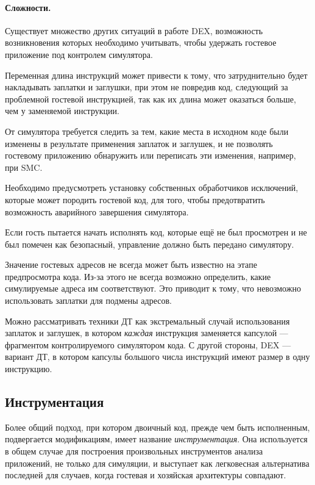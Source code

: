 \paragraph{Сложности.} Существует множество других ситуаций в работе DEX, возможность возникновения которых необходимо учитывать, чтобы удержать гостевое приложение под контролем симулятора.

\begin{itemize*}
    \item Переменная длина инструкций может привести к тому, что затруднительно будет накладывать заплатки и заглушки, при этом не повредив код, следующий за проблемной гостевой инструкцией, так как их длина может оказаться больше, чем у заменяемой инструкции.
    \item   От симулятора требуется следить за тем, какие места в исходном коде были изменены в результате применения заплаток и заглушек, и не позволять гостевому приложению обнаружить или переписать эти изменения, например, при SMC.
   \item Необходимо предусмотреть установку собственных обработчиков исключений, которые может породить гостевой код, для того, чтобы предотвратить возможность аварийного завершения симулятора. 
   \item Если гость пытается начать исполнять код, которые ещё не был просмотрен и не был помечен как безопасный, управление должно быть передано симулятору.
   \item Значение гостевых адресов не всегда может быть известно на этапе предпросмотра кода. Из-за этого не всегда возможно определить, какие симулируемые адреса им соответствуют. Это приводит к тому, что невозможно использовать заплатки для подмены адресов.
\end{itemize*}

\begin{digression}
Можно рассматривать техники ДТ как экстремальный случай использования заплаток и заглушек, в котором \emph{каждая} инструкция заменяется капсулой --- фрагментом контролируемого симулятором кода. С другой стороны, DEX --- вариант ДТ, в котором капсулы большого числа инструкций имеют размер в одну инструкцию.
\end{digression}

\subsection{Инструментация}

Более общий подход, при котором двоичный код, прежде чем быть исполненным, подвергается модификациям, имеет название \textit{инструментация}. Она используется в общем случае для построения произвольных инструментов анализа приложений, не только для симуляции, и выступает как легковесная альтернатива последней для случаев, когда гостевая и хозяйская архитектуры совпадают.

